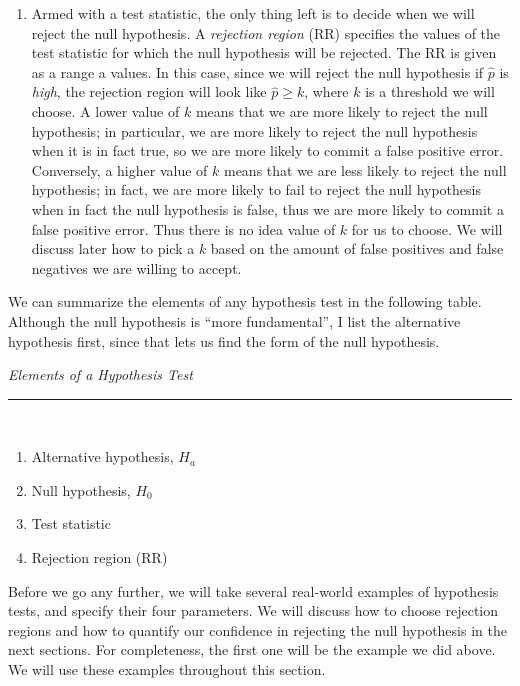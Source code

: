 \documentclass[notes.tex]{subfiles}
\begin{document}
\begin{example}
\begin{enumerate}
\item Armed with a test statistic, the only thing left is to decide when we will reject the null hypothesis. A \emph{rejection region} (RR) specifies the values of the test statistic for which the null hypothesis will be rejected. The RR is given as a range a values. In this case, since we will reject the null hypothesis if $\hat{p}$ is \emph{high}, the rejection region will look like $\hat{p} \geq k$, where $k$ is a threshold we will choose. A lower value of $k$ means that we are more likely to reject the null hypothesis; in particular, we are more likely to reject the null hypothesis when it is in fact true, so we are more likely to commit a false positive error. Conversely, a higher value of $k$ means that we are less likely to reject the null hypothesis; in fact, we are more likely to fail to reject the null hypothesis when in fact the null hypothesis is false, thus we are more likely to commit a false positive error. Thus there is no idea value of $k$ for us to choose. We will discuss later how to pick a $k$ based on the amount of false positives and false negatives we are willing to accept.
\end{enumerate}
\end{example}

We can summarize the elements of any hypothesis test in the following table. Although the null hypothesis is ``more fundamental'', I list the alternative hypothesis first, since that lets us find the form of the null hypothesis.

\begin{framed}
\emph{Elements of a Hypothesis Test}\\
  \rule{\dimexpr{}\fboxrule}{.1pt} \\
\begin{enumerate}
\item Alternative hypothesis, $H_a$
\item Null hypothesis, $H_0$
\item Test statistic
\item Rejection region (RR)
\end{enumerate}
\end{framed}

Before we go any further, we will take several real-world examples of hypothesis tests, and specify their four parameters. We will discuss how to choose rejection regions and how to quantify our confidence in rejecting the null hypothesis in the next sections. For completeness, the first one will be the example we did above. We will use these examples throughout this section.
\end{document}
